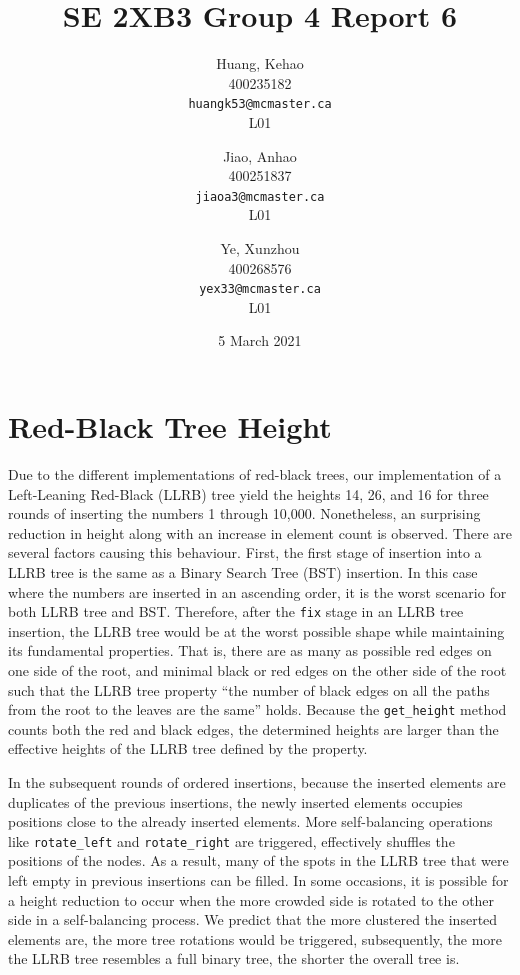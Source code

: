 \documentclass[titlepage, 12pt]{article}
\title{SE 2XB3 Group 4 Report 6}
\author{
  Huang, Kehao \\
  400235182 \\
  \texttt{huangk53@mcmaster.ca} \\
  L01
  \and
  Jiao, Anhao \\
  400251837 \\
  \texttt{jiaoa3@mcmaster.ca} \\
  L01
  \and
  Ye, Xunzhou \\
  400268576 \\
  \texttt{yex33@mcmaster.ca} \\
  L01
}
\date{5 March 2021}
\begin{document}
\maketitle{}

\newpage{}

\section{Red-Black Tree Height}
\label{sec:rbh}

Due to the different implementations of red-black trees, our implementation of a
Left-Leaning Red-Black (LLRB) tree yield the heights 14, 26, and 16 for three
rounds of inserting the numbers 1 through 10,000. Nonetheless, an surprising
reduction in height along with an increase in element count is observed. There
are several factors causing this behaviour. First, the first stage of insertion
into a LLRB tree is the same as a Binary Search Tree (BST) insertion. In this
case where the numbers are inserted in an ascending order, it is the worst
scenario for both LLRB tree and BST. Therefore, after the \texttt{fix} stage in
an LLRB tree insertion, the LLRB tree would be at the worst possible shape while
maintaining its fundamental properties. That is, there are as many as possible
red edges on one side of the root, and minimal black or red edges on the other
side of the root such that the LLRB tree property ``the number of black edges on
all the paths from the root to the leaves are the same'' holds. Because the
\texttt{get\_height} method counts both the red and black edges, the determined
heights are larger than the effective heights of the LLRB tree defined by the
property.

In the subsequent rounds of ordered insertions, because the inserted elements
are duplicates of the previous insertions, the newly inserted elements occupies
positions close to the already inserted elements. More self-balancing operations
like \texttt{rotate\_left} and \texttt{rotate\_right} are triggered, effectively
shuffles the positions of the nodes. As a result, many of the spots in the LLRB
tree that were left empty in previous insertions can be filled. In some
occasions, it is possible for a height reduction to occur when the more crowded
side is rotated to the other side in a self-balancing process. We predict that
the more clustered the inserted elements are, the more tree rotations would be
triggered, subsequently, the more the LLRB tree resembles a full binary tree,
the shorter the overall tree is.
\end{document}
